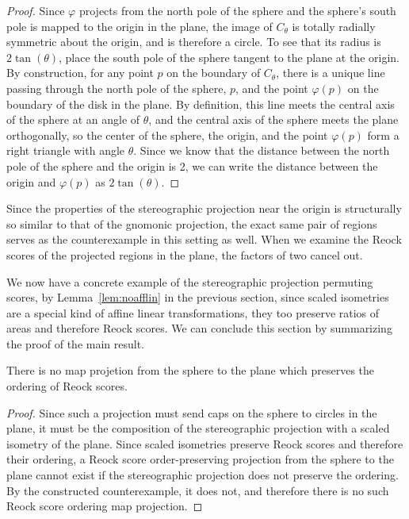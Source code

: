{\begin{proof}
Since $\varphi$ projects from the north pole of the sphere and the sphere's south pole is mapped to the origin in the plane, the image of $C_\theta$ is totally radially symmetric about the origin, and is therefore a circle.  To see that its radius is $2\tan(\theta)$, place the south pole of the sphere tangent to the plane at the origin. By construction, for any point $p$ on the boundary of $C_\theta$, there is a unique line passing through the north pole of the sphere, $p$, and the point $\varphi(p)$ on the boundary of the disk in the plane.  By definition, this line meets the central axis of the sphere at an angle of $\theta$, and the central axis of the sphere meets the plane orthogonally, so the center of the sphere, the origin, and the point $\varphi(p)$ form a right triangle with angle $\theta$.  Since we know that the distance between the north pole of the sphere and the origin is 2, we can write the distance between the origin and $\varphi(p)$ as $2\tan(\theta)$.

\end{proof}
}
Since the properties of the stereographic projection near the origin is structurally so similar to that of the gnomonic projection, the exact same pair of regions serves as the counterexample in this setting as well.  When we examine the Reock scores of the projected regions in the plane, the factors of two cancel out.



We now have a concrete example of the stereographic projection permuting scores, by Lemma~\ref{lem:noafflin} in the previous section, since scaled isometries are a special kind of affine linear transformations, they too preserve ratios of areas and therefore Reock scores.  We can conclude this section by summarizing the proof of the main result.

\begin{theorem}
There is no map projetion from the sphere to the plane which preserves the ordering of Reock scores.
\end{theorem}
\begin{proof}
Since such a projection must send caps on the sphere to circles in the plane, it must be the composition of the stereographic projection with a scaled isometry of the plane.  Since scaled isometries preserve Reock scores and therefore their ordering, a Reock score order-preserving projection from the sphere to the plane cannot exist if the stereographic projection does not preserve the ordering.  By the constructed counterexample, it does not, and therefore there is no such Reock score ordering map projection.
\end{proof}
